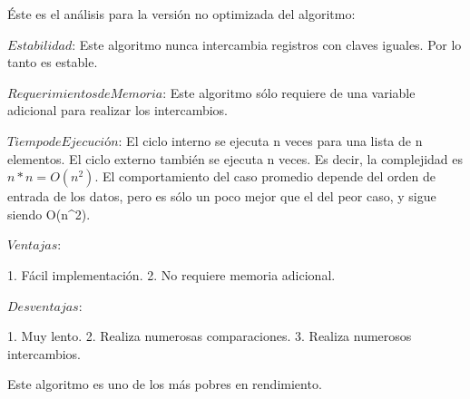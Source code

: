 Éste es el análisis para la versión no optimizada del algoritmo:

  $Estabilidad$:                Este algoritmo nunca intercambia registros con claves iguales. Por lo tanto es estable.
  
  $Requerimientos de Memoria$:  Este algoritmo sólo requiere de una variable adicional para realizar los intercambios.
  
  $Tiempo de Ejecución$:        El ciclo interno se ejecuta n veces para una lista de n elementos. El ciclo externo también
                                se ejecuta n veces. Es decir, la complejidad es $n*n= O(n^2)$. El comportamiento del caso 
                                promedio depende del orden de entrada de los datos, pero es sólo un poco mejor que el del 
                                peor caso, y sigue siendo O(n^2).
  
  $Ventajas$:

  1. Fácil implementación.
  2. No requiere memoria adicional.

  $Desventajas$:

  1. Muy lento.
  2. Realiza numerosas comparaciones.
  3. Realiza numerosos intercambios.


Este algoritmo es uno de los más pobres en rendimiento.
